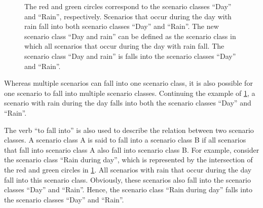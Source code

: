 \cbend
\setlength{\venncircle}{7em}
\begin{figure}
	\centering
	\caption{The red and green circles correspond to the scenario classes ``Day'' and ``Rain'', respectively. Scenarios that occur during the day with rain fall into both scenario classes ``Day'' and ``Rain''. The new scenario class ``Day and rain'' can be defined as the scenario class in which all scenarios that occur during the day with rain fall. The scenario class ``Day and rain'' is falls into the scenario classes ``Day'' and ``Rain''.}
	\label{fig:venn diagram scenario class}
\end{figure}
\cbstart

Whereas multiple scenarios can fall into one scenario class, it is also possible for one scenario to fall into multiple scenario classes. Continuing the example of \cref{fig:venn diagram scenario class}, a scenario with rain during the day falls into both the scenario classes ``Day'' and ``Rain''.

The verb ``to fall into'' is also used to describe the relation between two scenario classes. A scenario class A is said to fall into a scenario class B if all scenarios that fall into scenario class A also fall into scenario class B. 
For example, consider the scenario class ``Rain during day'', which is represented by the intersection of the red and green circles in \cref{fig:venn diagram scenario class}. All scenarios with rain that occur during the day fall into this scenario class. Obviously, these scenarios also fall into the scenario classes ``Day'' and ``Rain''. Hence, the scenario class ``Rain during day'' falls into the scenario classes ``Day'' and ``Rain''.

